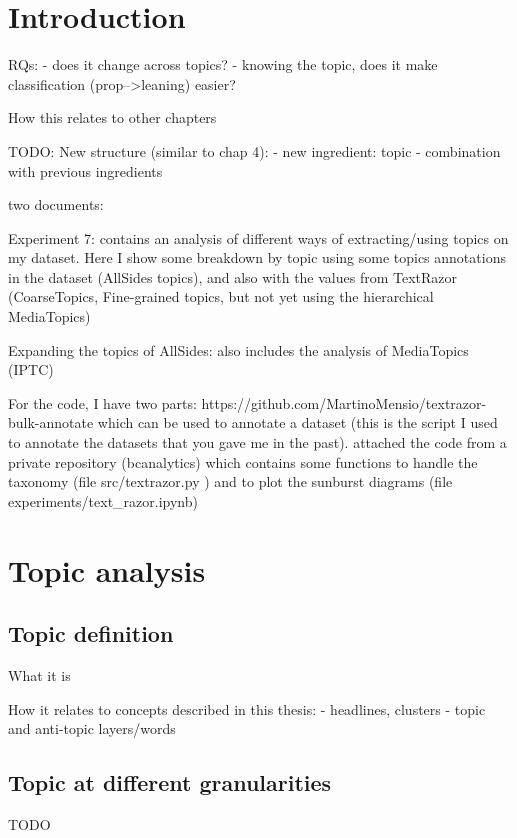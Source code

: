 \label{chap:topics}

\section{Introduction}
RQs:
- does it change across topics?
- knowing the topic, does it make classification (prop-->leaning) easier?

How this relates to other chapters


TODO: New structure (similar to chap 4):
- new ingredient: topic
- combination with previous ingredients


two documents:

Experiment 7: contains an analysis of different ways of extracting/using topics on my dataset. Here I show some breakdown by topic using some topics annotations in the dataset (AllSides topics), and also with the values from TextRazor (CoarseTopics, Fine-grained topics, but not yet using the hierarchical MediaTopics)

Expanding the topics of AllSides: also includes the analysis of MediaTopics (IPTC)


For the code, I have two parts:
https://github.com/MartinoMensio/textrazor-bulk-annotate which can be used to annotate a dataset (this is the script I used to annotate the datasets that you gave me in the past).
attached the code from a private repository (bcanalytics) which contains some functions to handle the taxonomy (file src/textrazor.py ) and to plot the sunburst diagrams (file experiments/text\_razor.ipynb)

\section{Topic analysis}

\subsection{Topic definition}

What it is

How it relates to concepts described in this thesis:
- headlines, clusters
- topic and anti-topic layers/words

\subsection{Topic at different granularities}

TODO

